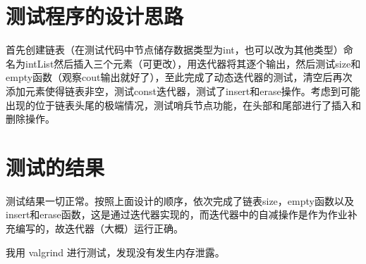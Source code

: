 \documentclass[UTF8]{ctexart}
\begin{document}
\pagestyle{fancy}
\fancyhead{}

\section{测试程序的设计思路}

首先创建链表（在测试代码中节点储存数据类型为int，也可以改为其他类型）命名为intList然后插入三个元素（可更改），用迭代器将其逐个输出，然后测试size和empty函数（观察cout输出就好了），至此完成了动态迭代器的测试，清空后再次添加元素使得链表非空，测试const迭代器，测试了insert和erase操作。考虑到可能出现的位于链表头尾的极端情况，测试哨兵节点功能，在头部和尾部进行了插入和删除操作。

\section{测试的结果}

测试结果一切正常。按照上面设计的顺序，依次完成了链表size，empty函数以及insert和erase函数，这是通过迭代器实现的，而迭代器中的自减操作是作为作业补充编写的，故迭代器（大概）运行正确。

我用 valgrind 进行测试，发现没有发生内存泄露。
\end{document}
